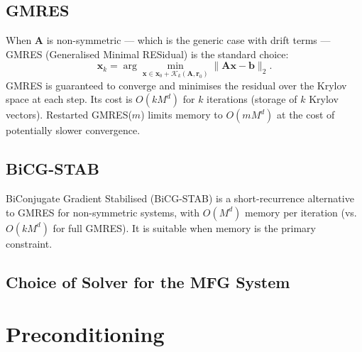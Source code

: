 \subsection{GMRES}

When $\mathbf{A}$ is non-symmetric --- which is the generic case with drift terms
--- GMRES (Generalised Minimal RESidual) is the standard choice:
\[
    \mathbf{x}_k = \arg\min_{\mathbf{x} \in \mathbf{x}_0 +
    \mathcal{K}_k(\mathbf{A},\mathbf{r}_0)} \|\mathbf{A}\mathbf{x} - \mathbf{b}\|_2.
\]
GMRES is guaranteed to converge and minimises the residual over the Krylov space
at each step. Its cost is $O(k M^d)$ for $k$ iterations (storage of $k$ Krylov
vectors). Restarted GMRES($m$) limits memory to $O(m M^d)$ at the cost of
potentially slower convergence.

\subsection{BiCG-STAB}

BiConjugate Gradient Stabilised (BiCG-STAB) is a short-recurrence alternative to
GMRES for non-symmetric systems, with $O(M^d)$ memory per iteration (vs. $O(k M^d)$
for full GMRES). It is suitable when memory is the primary constraint.

\subsection{Choice of Solver for the MFG System}

\begin{table}[ht]
\centering
\caption{Recommended Krylov solver by operator type}
\label{tab:krylov-choice}
\end{table}

\section{Preconditioning}
\label{sec:sc-precond}

